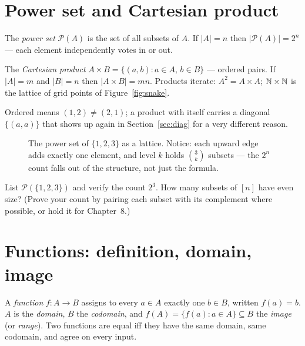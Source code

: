 \section{Power set and Cartesian product}\label{sec:powprod}

\begin{definition}
The \emph{power set} $\mathcal{P}(A)$ is the set of all subsets of $A$.
If $|A| = n$ then $|\mathcal{P}(A)| = 2^n$ --- each element independently
votes in or out.
\end{definition}

\begin{definition}
The \emph{Cartesian product} $A \times B = \{(a,b) : a \in A,\, b \in B\}$ ---
ordered pairs. If $|A| = m$ and $|B| = n$ then $|A \times B| = mn$. Products
iterate: $A^2 = A \times A$; $\mathbb{N} \times \mathbb{N}$ is the lattice of grid points of
Figure~\ref{fig:snake}.
\end{definition}

Ordered means $(1,2) \neq (2,1)$; a product with itself carries a diagonal
$\{(a,a)\}$ that shows up again in Section~\ref{sec:diag} for a very different
reason.

\begin{figure}[ht]\centering

\caption{The power set of $\{1,2,3\}$ as a lattice. Notice: each upward edge
adds exactly one element, and level $k$ holds $\binom{3}{k}$ subsets ---
the $2^n$ count falls out of the structure, not just the formula.}
\label{fig:lattice}
\end{figure}

\begin{exercise}[easy]\label{exr:powset}
List $\mathcal{P}(\{1,2,3\})$ and verify the count $2^3$. How many subsets of
$[n]$ have even size? (Prove your count by pairing each subset with its
complement where possible, or hold it for Chapter~8.)
\end{exercise}

\section{Functions: definition, domain, image}\label{sec:functions}

\begin{definition}
A \emph{function} $f : A \to B$ assigns to every $a \in A$ exactly one
$b \in B$, written $f(a) = b$. $A$ is the \emph{domain}, $B$ the
\emph{codomain}, and $f(A) = \{f(a) : a \in A\} \subseteq B$ the
\emph{image} (or \emph{range}). Two functions are equal iff they have the
same domain, same codomain, and agree on every input.
\end{definition}

